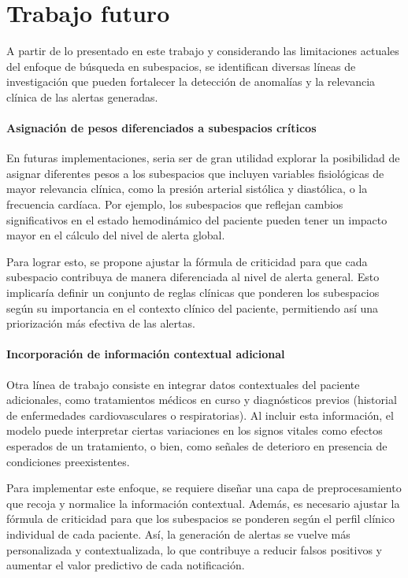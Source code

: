 \section{Trabajo futuro}

A partir de lo presentado en este trabajo y considerando las limitaciones actuales del enfoque de búsqueda en subespacios, se identifican diversas líneas de investigación que pueden fortalecer la detección de anomalías y la relevancia clínica de las alertas generadas.

\paragraph{Asignación de pesos diferenciados a subespacios críticos}

En futuras implementaciones, seria ser de gran utilidad explorar la posibilidad de asignar diferentes pesos a los subespacios que incluyen variables fisiológicas de mayor relevancia clínica, como la presión arterial sistólica y diastólica, o la frecuencia cardíaca. Por ejemplo, los subespacios que reflejan cambios significativos en el estado hemodinámico del paciente pueden tener un impacto mayor en el cálculo del nivel de alerta global.

Para lograr esto, se propone ajustar la fórmula de criticidad para que cada subespacio contribuya de manera diferenciada al nivel de alerta general. Esto implicaría definir un conjunto de reglas clínicas que ponderen los subespacios según su importancia en el contexto clínico del paciente, permitiendo así una priorización más efectiva de las alertas.

\paragraph{Incorporación de información contextual adicional}

Otra línea de trabajo consiste en integrar datos contextuales del paciente adicionales, como tratamientos médicos en curso y diagnósticos previos (historial de enfermedades cardiovasculares o respiratorias). Al incluir esta información, el modelo puede interpretar ciertas variaciones en los signos vitales como efectos esperados de un tratamiento, o bien, como señales de deterioro en presencia de condiciones preexistentes.

Para implementar este enfoque, se requiere diseñar una capa de preprocesamiento que recoja y normalice la información contextual. Además, es necesario ajustar la fórmula de criticidad para que los subespacios se ponderen según el perfil clínico individual de cada paciente. Así, la generación de alertas se vuelve más personalizada y contextualizada, lo que contribuye a reducir falsos positivos y aumentar el valor predictivo de cada notificación.

